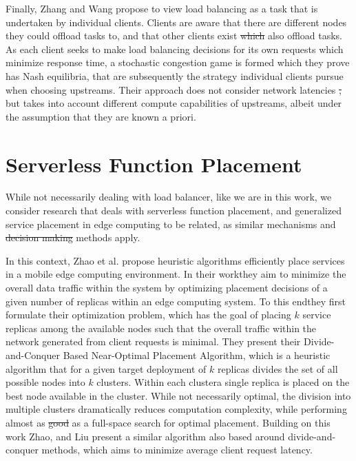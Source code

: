 \documentclass[draft,final]{vutinfth} %
\providecommand{\DIFaddtex}[1]{{\protect\color{blue}\uwave{#1}}} %
\providecommand{\DIFdeltex}[1]{{\protect\color{red}\sout{#1}}}                      %
\providecommand{\DIFaddbegin}{} %
\providecommand{\DIFaddend}{} %
\providecommand{\DIFdelbegin}{} %
\providecommand{\DIFdelend}{} %
\providecommand{\DIFadd}[1]{\texorpdfstring{\DIFaddtex{#1}}{#1}} %
\providecommand{\DIFdel}[1]{\texorpdfstring{\DIFdeltex{#1}}{}} %
\begin{document}
Finally, Zhang and Wang\cite{zhangStochasticCongestionGame2021} propose to view load balancing as a task that is undertaken by individual clients.
Clients are aware that there are different nodes they could offload tasks to, and that other clients exist \DIFdelbegin \DIFdel{which }\DIFdelend \DIFaddbegin \DIFadd{that }\DIFaddend also offload tasks.
As each client seeks to make load balancing decisions for its own requests which minimize response time, a stochastic congestion game is formed\cite{zhangStochasticCongestionGame2021} which they prove has Nash equilibria, that are subsequently the strategy individual clients pursue when choosing upstreams.
Their approach does not consider network latencies \DIFdelbegin \DIFdel{, }\DIFdelend but takes into account different compute capabilities of upstreams, albeit under the assumption that they are known a priori.


\section{Serverless Function Placement}
While not necessarily dealing with load balancer, like we are in this work, we consider research that deals with serverless function placement, and generalized service placement in edge computing to be related, as similar mechanisms and \DIFdelbegin \DIFdel{decision making }\DIFdelend \DIFaddbegin \DIFadd{decision-making }\DIFaddend methods apply.

In this context, Zhao et al. \cite{zhaoOptimalPlacementVirtual2017} propose heuristic algorithms efficiently place services in a mobile edge computing environment.
In their work\DIFaddbegin \DIFadd{, }\DIFaddend they aim to minimize the overall data traffic within the system by optimizing placement decisions of a given number of replicas within an edge computing system.
To this end\DIFaddbegin \DIFadd{, }\DIFaddend they first formulate their optimization problem, which has the goal of placing $k$ service replicas among the available nodes such that the overall traffic within the network generated from client requests is minimal.
They present their Divide-and-Conquer Based Near-Optimal Placement Algorithm\cite{zhaoOptimalPlacementVirtual2017}, which is a heuristic algorithm that for a given target deployment of $k$ replicas divides the set of all possible nodes into $k$ clusters.
Within each cluster\DIFaddbegin \DIFadd{, }\DIFaddend a single replica is placed on the best node available in the cluster.
While not necessarily optimal, the division into multiple clusters dramatically reduces computation complexity, while performing almost as \DIFdelbegin \DIFdel{good }\DIFdelend \DIFaddbegin \DIFadd{well }\DIFaddend as a full-space search for optimal placement.
Building on this work Zhao, and Liu\cite{zhaoOptimalPlacementVirtual2018} present a similar algorithm also based around divide-and-conquer methods, which aims to minimize average client request latency.
\end{document}
